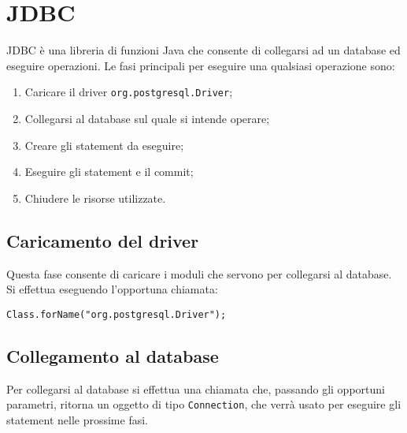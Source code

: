 \documentclass[a4paper, 10pt, titlepage]{article}
\begin{document}
\section{JDBC}
JDBC è una libreria di funzioni Java che consente di collegarsi ad un database ed eseguire operazioni.
Le fasi principali per eseguire una qualsiasi operazione sono:

\begin{enumerate}
	\item Caricare il driver \lstinline|org.postgresql.Driver|;
	
	\item Collegarsi al database sul quale si intende operare;
	
	\item Creare gli statement da eseguire;
	
	\item Eseguire gli statement e il commit;
	
	\item Chiudere le risorse utilizzate.
\end{enumerate}

\subsection{Caricamento del driver}
Questa fase consente di caricare i moduli che servono per collegarsi al database. Si effettua eseguendo l'opportuna chiamata:
\lstset{language=Java}
\begin{lstlisting}
Class.forName("org.postgresql.Driver");
\end{lstlisting}

\subsection{Collegamento al database}
Per collegarsi al database si effettua una chiamata che, passando gli opportuni parametri, ritorna un oggetto di tipo \lstinline|Connection|, che verrà usato per eseguire gli statement nelle prossime fasi.
\end{document}
